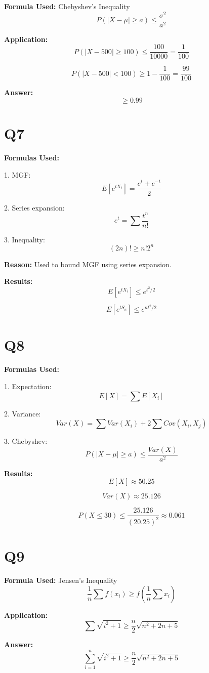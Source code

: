 \documentclass[12pt]{article}
\begin{document}
\textbf{Formula Used:} Chebyshev’s Inequality
\[
P(|X - \mu| \ge a) \le \frac{\sigma^2}{a^2}
\]

\textbf{Application:}
\[
P(|X - 500| \ge 100) \le \frac{100}{10000} = \frac{1}{100}
\]

\[
P(|X - 500| < 100) \ge 1 - \frac{1}{100} = \frac{99}{100}
\]

\textbf{Answer:}
\[
\ge 0.99
\]

\section*{Q7}

\textbf{Formulas Used:}

1. MGF:
\[
E[e^{tX_i}] = \frac{e^t + e^{-t}}{2}
\]

2. Series expansion:
\[
e^t = \sum \frac{t^n}{n!}
\]

3. Inequality:
\[
(2n)! \ge n!2^n
\]

\textbf{Reason:} Used to bound MGF using series expansion.

\textbf{Results:}
\[
E[e^{tX_i}] \le e^{t^2/2}
\]

\[
E[e^{tS_n}] \le e^{nt^2/2}
\]

\section*{Q8}

\textbf{Formulas Used:}

1. Expectation:
\[
E[X] = \sum E[X_i]
\]

2. Variance:
\[
Var(X) = \sum Var(X_i) + 2\sum Cov(X_i,X_j)
\]

3. Chebyshev:
\[
P(|X-\mu| \ge a) \le \frac{Var(X)}{a^2}
\]

\textbf{Results:}
\[
E[X] \approx 50.25
\]

\[
Var(X) \approx 25.126
\]

\[
P(X \le 30) \le \frac{25.126}{(20.25)^2} \approx 0.061
\]

\section*{Q9}

\textbf{Formula Used:} Jensen’s Inequality
\[
\frac{1}{n}\sum f(x_i) \ge f\left(\frac{1}{n}\sum x_i\right)
\]

\textbf{Application:}
\[
\sum \sqrt{i^2+1} \ge \frac{n}{2}\sqrt{n^2 + 2n + 5}
\]

\textbf{Answer:}
\[
\sum_{i=1}^n \sqrt{i^2+1} \ge \frac{n}{2}\sqrt{n^2 + 2n + 5}
\]
\end{document}
